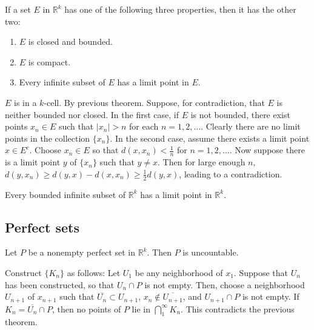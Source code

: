 \begin{theorem}
If a set $E$ in $\mathbb{R}^k$ has one of the following three properties, then it has the other two:
\begin{enumerate}[label={(\alph*)}]
\item $E$ is closed and bounded.
\item $E$ is compact.
\item Every infinite subset of $E$ has a limit point in $E$.
\end{enumerate}
\end{theorem}
\begin{hardproof}
 $E$ is in a $k$-cell.
 By previous theorem.
 Suppose, for contradiction, that $E$ is neither bounded nor closed. In the first case, if $E$ is not bounded, there exist points $x_n\in E$ such that $|x_n|>n$ for each $n=1,2,\dots$. Clearly there are no limit points in the collection $\{x_n\}$. In the second case, assume there exists a limit point $x\in E^c$. Choose $x_n\in E$ so that $d(x,x_n)<\frac{1}{n}$ for $n=1,2,\dots$. Now suppose there is a limit point $y$ of $\{x_n\}$ such that $y\neq x$. Then for large enough $n$, $d(y,x_n) \geq d(y,x) - d(x,x_n) \geq \frac{1}{2}d(y,x)$, leading to a contradiction.
\end{hardproof}

\begin{theorem}
\label{thm:bolzano_weierstrass_thm_in_euclidean_set}
Every bounded infinite subset of $\mathbb{R}^k$ has a limit point in $\mathbb{R}^k$.
\end{theorem}

\subsection{Perfect sets}

\begin{theorem}[pma 2.43]
Let $P$ be a nonempty perfect set in $\mathbb{R}^k$. Then $P$ is uncountable.
\end{theorem}
\begin{hardproof}
Construct $\{K_n\}$ as follows: Let $U_1$ be any neighborhood of $x_1$. Suppose that $U_n$ has been constructed, so that $U_n\cap P$ is not empty. Then, choose a neighborhood $U_{n+1}$ of $x_{n+1}$ such that $\overline{U_n}\subset U_{n+1}$, $x_n\notin \overline{U_{n+1}}$, and $U_{n+1}\cap P$ is not empty. If $K_n=\overline{U_n}\cap P$, then no points of $P$ lie in $\bigcap_1^\infty K_n$. This contradicts the previous theorem.
\end{hardproof}

